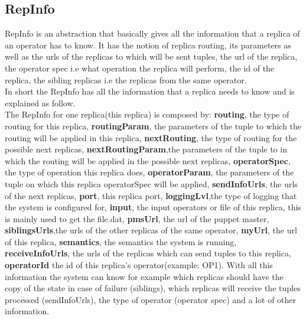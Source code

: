\documentclass[times, 10pt, twocolumn]{article}
\begin{document}
\subsection{RepInfo}
RepInfo is an abstraction that basically gives all the information that a replica of an operator has to know. It has the notion of replica routing, its parameters as well as the urls of the replicas to which will be sent tuples, the url of the replica, the operator spec i.e what operation the replica will perform, the id of the replica, the sibling replicas i.e the replicas from the same operator. 
\\In short the RepInfo has all the information that a replica needs to know and is explained as follow.
\\The RepInfo for one replica(this replica) is composed by: \textbf{routing}, the type of routing for this replica, \textbf{routingParam}, the parameters of the tuple to which the routing will be applied in this replica, \textbf{nextRouting}, the type of routing for the possible next replicas, \textbf{nextRoutingParam},the parameters of the tuple to in which the routing will be applied in the possible next replicas, \textbf{operatorSpec}, the type of operation this replica does, \textbf{operatorParam}, the parameters of the tuple on which this replica operatorSpec will be applied, \textbf{sendInfoUrls}, the urls of the next replicas, \textbf{port}, this replica port, \textbf{loggingLvl},the type of logging that the system is configured for, \textbf{input}, the input operators or file of this replica, this is mainly used to get the file.dat, \textbf{pmsUrl}, the url of the puppet master, \textbf{siblingsUrls},the urls of the other replicas of the same operator, \textbf{myUrl}, the url of this replica, \textbf{semantics}, the semantics the system is running, \textbf{receiveInfoUrls}, the urls of the replicas which can send tuples to this replica, \textbf{operatorId} the id of this replica's operator(example: OP1). With all this information the system can know for example which replicas should have the copy of the state in case of failure (siblings), which replicas will receive the tuples processed (sendInfoUrls), the type of operator (operator spec) and a lot of other information.


\end{document}
